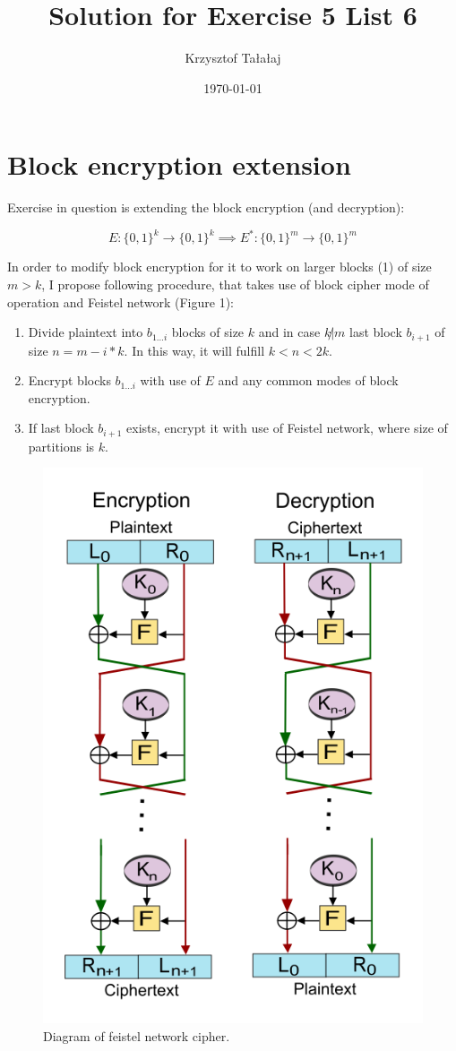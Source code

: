 \documentclass{article}
\title{Solution for Exercise 5 List 6}
\author{Krzysztof Tałałaj}
\date{\today}
\begin{document}
    \maketitle

    \section{Block encryption extension}

    Exercise in question is extending the block encryption (and decryption):

    \begin{equation}
        E: \{0,1\}^k \to \{0,1\}^k \implies E^*: \{0,1\}^m \to \{0,1\}^m
    \end{equation}


    \vspace{.2cm} In order to modify block encryption for it to work on larger blocks (1) of size $m > k$, I propose following procedure, that takes use of block cipher mode of operation and Feistel network (Figure 1):

    \begin{enumerate}
        \item Divide plaintext into $b_{1 \dots i}$ blocks of size $k$ and in case $k\not| m$ last block $b_{i+1}$ of size $n = m - i * k$. In this way, it will fulfill $k < n < 2k$.
        \item Encrypt blocks $b_{1 \dots i}$ with use of $E$ and any common modes of block encryption.
        \item If last block $b_{i+1}$ exists, encrypt it with use of Feistel network, where size of partitions is $k$.
    \end{enumerate}

    \begin{figure}[h]
        \begin{center}
            \includegraphics[width=.3\linewidth]{./493px-Feistel_cipher_diagram_en.svg.png}
            \caption{Diagram of feistel network cipher.}
        \end{center}
    \end{figure}
\end{document}
